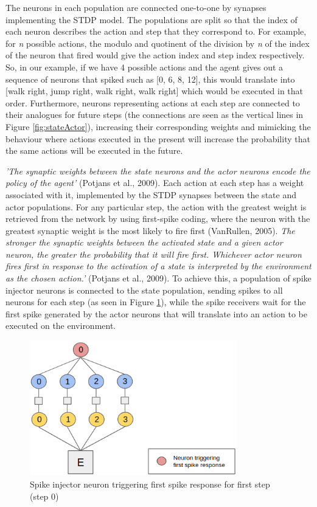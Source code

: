 \documentclass[10pt]{article}
\begin{document}
    \newpage
    The neurons in each population are connected one-to-one by synapses implementing the STDP model. The populations are split so that the index of each neuron describes the action and step that they correspond to. For example, for \textit{n} possible actions, the modulo and quotinent of the division by \textit{n} of the index of the neuron that fired would give the action index and step index respectively. So, in our example, if we have 4 possible actions and the agent gives out a sequence of neurons that spiked such as [0, 6, 8, 12], this would translate into [walk right, jump right, walk right, walk right] which would be executed in that order. Furthermore, neurons representing actions at each step are connected to their analogues for future steps (the connections are seen as the vertical lines in Figure \ref{fig:stateActor}), increasing their corresponding weights and mimicking the behaviour where actions executed in the present will increase the probability that the same actions will be executed in the future.

    \textit{'The synaptic weights between the state neurons and the actor neurons encode the policy of the agent'} (Potjans et al., 2009). Each action at each step has a weight associated with it, implemented by the STDP synapses between the state and actor populations. For any particular step, the action with the greatest weight is retrieved from the network by using first-spike coding, where the neuron with the greatest synaptic weight is the most likely to fire first (VanRullen, 2005). \textit{The stronger the synaptic weights between the activated state and a given actor
    neuron, the greater the probability that it will fire first. Whichever actor
    neuron fires first in response to the activation of a state is interpreted by
    the environment as the chosen action.'} (Potjans et al., 2009). To achieve this, a population of spike injector neurons is connected to the state population, sending spikes to all neurons for each step (as seen in Figure \ref{fig:firstSpike}), while the spike receivers wait for the first spike generated by the actor neurons that will translate into an action to be executed on the environment.

    \setcounter{figure}{5}

    \begin{figure}[ht!]
    \centering
    \includegraphics[width=90mm]{./firstSpike.png}
    \caption{Spike injector neuron triggering first spike response for first step (step 0) \label{overflow}}
    \label{fig:firstSpike}
    \end{figure}
\end{document}

